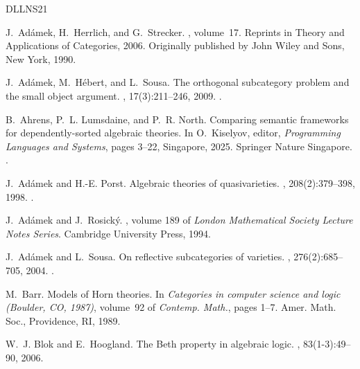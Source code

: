 \documentclass[a4paper,10pt,reqno]{amsart}
\theoremstyle{definition}
\theoremstyle{remark}
\begin{document}
\begin{thebibliography}{DLLNS21}

  J.~Ad{\'a}mek, H.~Herrlich, and G.~Strecker.
  , volume~17.
  \newblock Reprints in Theory and Applications of Categories, 2006.
  \newblock Originally published by John Wiley and Sons, New York, 1990.
  
  J.~Ad{\'a}mek, M.~H{\'e}bert, and L.~Sousa.
  \newblock The orthogonal subcategory problem and the small object argument.
  , 17(3):211--246, 2009.
  \newblock \href {https://doi.org/10.1007/s10485-008-9153-4} {}.
  
  B.~Ahrens, P.~L. Lumsdaine, and P.~R. North.
  \newblock Comparing semantic frameworks for dependently-sorted algebraic theories.
  \newblock In O.~Kiselyov, editor, {\em Programming Languages and Systems}, pages 3--22, Singapore, 2025. Springer Nature Singapore.
  \newblock \href {https://doi.org/10.1007/978-981-97-8943-6_1} {}.
  
  J.~Ad{\'a}mek and H.-E. Porst.
  \newblock Algebraic theories of quasivarieties.
  , 208(2):379--398, 1998.
  \newblock \href {https://doi.org/10.1006/jabr.1998.7499} {}.
  
  J.~Ad{\'a}mek and J.~Rosick{\'y}.
  , volume 189 of {\em London Mathematical Society Lecture Notes Series}.
  \newblock Cambridge University Press, 1994.
  
  J.~Ad{\'a}mek and L.~Sousa.
  \newblock On reflective subcategories of varieties.
  , 276(2):685--705, 2004.
  \newblock \href {https://doi.org/10.1016/j.jalgebra.2003.09.039} {}.
  
  M.~Barr.
  \newblock Models of {H}orn theories.
  \newblock In {\em Categories in computer science and logic ({B}oulder, {CO}, 1987)}, volume~92 of {\em Contemp. Math.}, pages 1--7. Amer. Math. Soc., Providence, RI, 1989.
  
  W.~J. Blok and E.~Hoogland.
  \newblock The {B}eth property in algebraic logic.
  , 83(1-3):49--90, 2006.
  

\end{thebibliography}
\end{document}
